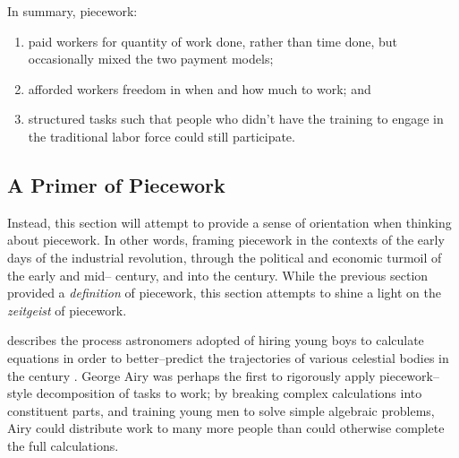 \documentclass[trackingWork]{subfiles}
\begin{document}
In summary, piecework:
\begin{enumerate}
  \item paid workers for quantity of work done, rather than time done,
        but occasionally mixed the two payment models;
  \item afforded workers freedom in when and how much to work; and
  \item structured tasks such that people who didn't have the training
        to engage in the traditional labor force could still participate.
\end{enumerate}







\subsection{A Primer of Piecework}\label{sec:pieceworkPrimer} %
Instead, this section will attempt to provide a sense of orientation when thinking about piecework.
In other words, framing piecework in the contexts of
the early days of the industrial revolution,
through the political and economic turmoil of the early and mid-- century,
and into the  century.
While the previous section provided a \textit{definition} of piecework,
this section attempts to shine a light on the \textit{zeitgeist} of piecework.


\citeauthor{grier2013computers} describes the process astronomers adopted of hiring young boys
to calculate equations in order
to better--predict the trajectories of various celestial bodies in the  century
\cite{grier2013computers}.
George Airy was perhaps the first to rigorously apply piecework--style decomposition of tasks to work;
by breaking complex calculations into constituent parts, and
training young men to solve simple algebraic problems,
Airy could distribute work to many more people than could otherwise complete the full calculations.
\end{document}
